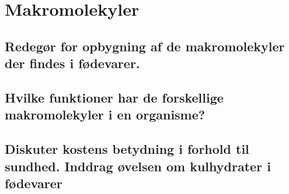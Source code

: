 \newpage
\section{Makromolekyler}
\subsection{Redegør for opbygning af de makromolekyler der findes i fødevarer.}
\subsection{Hvilke funktioner har de forskellige makromolekyler i en organisme?}
\subsection{Diskuter kostens betydning i forhold til sundhed. Inddrag øvelsen om kulhydrater i fødevarer}